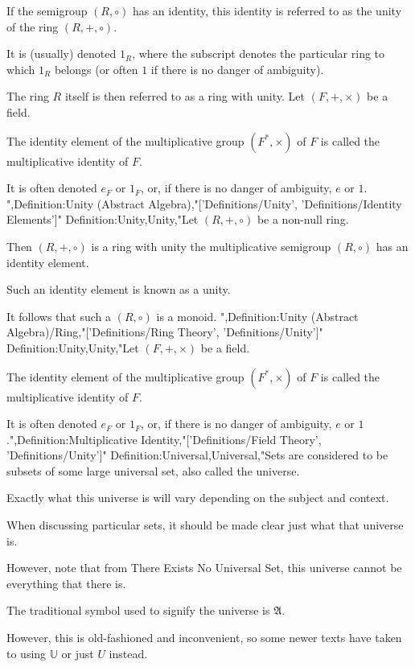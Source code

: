 If the semigroup $\left( R, \circ \right)$ has an identity, this identity is referred to as the unity of the ring $\left( R, +, \circ \right)$.

It is (usually) denoted $1_R$, where the subscript denotes the particular ring to which $1_R$ belongs (or often $1$ if there is no danger of ambiguity).


The ring $R$ itself is then referred to as a ring with unity.
Let $\left( F, +, \times \right)$ be a field.

The identity element of the multiplicative group $\left( F^*, \times \right)$ of $F$ is called the multiplicative identity of $F$.

It is often denoted $e_F$ or $1_F$, or, if there is no danger of ambiguity, $e$ or $1$.
",Definition:Unity (Abstract Algebra),"['Definitions/Unity', 'Definitions/Identity Elements']"
Definition:Unity,Unity,"Let $\left( R, +, \circ \right)$ be a non-null ring.

Then $\left( R, +, \circ \right)$ is a ring with unity  the multiplicative semigroup $\left( R, \circ \right)$ has an identity element.

Such an identity element is known as a unity.


It follows that such a $\left( R, \circ \right)$ is a monoid.
",Definition:Unity (Abstract Algebra)/Ring,"['Definitions/Ring Theory', 'Definitions/Unity']"
Definition:Unity,Unity,"Let $\left( F, +, \times \right)$ be a field.

The identity element of the multiplicative group $\left( F^*, \times \right)$ of $F$ is called the multiplicative identity of $F$.

It is often denoted $e_F$ or $1_F$, or, if there is no danger of ambiguity, $e$ or $1$.",Definition:Multiplicative Identity,"['Definitions/Field Theory', 'Definitions/Unity']"
Definition:Universal,Universal,"Sets are considered to be subsets of some large universal set, also called the universe.

Exactly what this universe is will vary depending on the subject and context.

When discussing particular sets, it should be made clear just what that universe is.

However, note that from There Exists No Universal Set, this universe cannot be everything that there is.


The traditional symbol used to signify the universe is $\mathfrak A$.

However, this is old-fashioned and inconvenient, so some newer texts have taken to using $\mathbb U$ or just $U$ instead.


